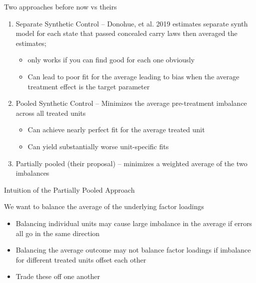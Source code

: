 \documentclass{beamer}
\begin{document}

\begin{frame}{Two approaches before now vs theirs}

\begin{enumerate}

\item Separate Synthetic Control -- Donohue, et al. 2019 estimates separate synth model for each state that passed concealed carry laws then averaged the estimates;
	\begin{itemize}
	\item  only works if you can find good for each one obviously
	\item Can lead to poor fit for the average leading to bias when the average treatment effect is the target parameter
	\end{itemize}
\item Pooled Synthetic Control -- Minimizes the average pre-treatment imbalance across all treated units
	\begin{itemize}
	\item Can achieve nearly perfect fit for the average treated unit
	\item Can yield substantially worse unit-specific fits
	\end{itemize}
\item Partially pooled (their proposal) -- minimizes a weighted average of the two imbalances

\end{enumerate}

\end{frame}

\begin{frame}{Intuition of the Partially Pooled Approach}

We want to balance the average of the underlying factor loadings

\begin{itemize}
\item Balancing individual units may cause large imbalance in the average if errors all go in the same direction
\item Balancing the average outcome may not balance factor loadings if imbalance for different treated units offset each other
\item Trade these off one another
\end{itemize}

\end{frame}
\end{document}
